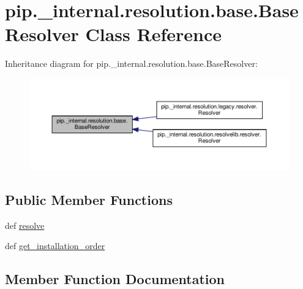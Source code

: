 \hypertarget{classpip_1_1__internal_1_1resolution_1_1base_1_1BaseResolver}{}\section{pip.\+\_\+internal.\+resolution.\+base.\+Base\+Resolver Class Reference}
\label{classpip_1_1__internal_1_1resolution_1_1base_1_1BaseResolver}


Inheritance diagram for pip.\+\_\+internal.\+resolution.\+base.\+Base\+Resolver\+:
\nopagebreak
\begin{figure}[H]
\begin{center}
\leavevmode
\includegraphics[width=350pt]{classpip_1_1__internal_1_1resolution_1_1base_1_1BaseResolver__inherit__graph}
\end{center}
\end{figure}
\subsection*{Public Member Functions}
\begin{DoxyCompactItemize}
\item 
def \hyperlink{classpip_1_1__internal_1_1resolution_1_1base_1_1BaseResolver_a7b30f23c7302a4e07977e1ee24b96279}{resolve}
\item 
def \hyperlink{classpip_1_1__internal_1_1resolution_1_1base_1_1BaseResolver_a76c35d418ad24a693fd4141d3dce9d71}{get\+\_\+installation\+\_\+order}
\end{DoxyCompactItemize}


\subsection{Member Function Documentation}
\mbox{\label{classpip_1_1__internal_1_1resolution_1_1base_1_1BaseResolver_a76c35d418ad24a693fd4141d3dce9d71}} 
